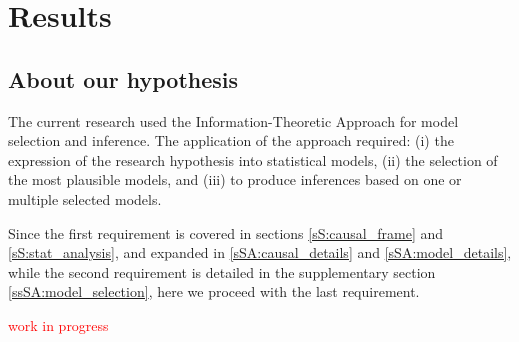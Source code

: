 \section{Results} \label{S:results}
%
\subsection{About our hypothesis} \label{sS:results_hypothesis}
%
The current research used the Information-Theoretic Approach \citep{Anderson_2008, Chamberlain_1965} for model selection and inference. The application of the approach required: (i) the expression of the research hypothesis into statistical models, (ii) the selection of the most plausible models, and (iii) to produce inferences based on one or multiple selected models.

Since the first requirement is covered in sections \ref{sS:causal_frame} and \ref{sS:stat_analysis}, and expanded in \ref{sSA:causal_details} and \ref{sSA:model_details}, while the second requirement is detailed in the supplementary section \ref{ssSA:model_selection}, here we proceed with the last requirement. 

\textcolor{red}{work in progress}

\begin{comment}
“simplest” model (E_NC2b) provides
(preliminar) evidence on,
the higher the unaided PTA the
lower the child’s SI (bP[2])
(based on power analysis, we can be
sure is a small effect)
no apparent statistical difference
between NH and HI=CI children
(but this requires a CONTRAST)
for each “hearing” year, the SI
increases in approx 0:40 logits
(effect larger than the assumed in
power analysis)


however, the “interaction” model
(E_NC5b3) shows similar results on,
the small (still non-significant)
effects of the unaided PTA on the
child’s SI
similar explained variability across
levels and blocks
(similar to the “simplest” model)
but “mild” evidence of prevalent
interactions,
SI means for HI=CI per E,
aEHS[2; 2] (Genetic) vs
aEHS[3; 2] (CMV)
different SI evolution for NH vs
HI=CI children, per unit A
(bAHS),

within the “interaction” model,
the size of the data within groups
from combinations of E and HS,
does not allow to reject the
contrasts’ null hypothesis,
similar result is observed on the
bAHS contrast
(because the effect is small, compared
to children’s variability)
but we still observe differences
between NH and HI/CI, and even
within HI/CI by E,
therefore we decide to keep the
(E_NC5b3) model
\end{comment}

